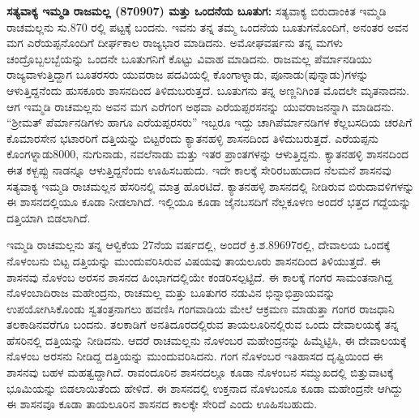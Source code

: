 \textbf{ಸತ್ಯವಾಕ್ಯ ಇಮ್ಮಡಿ ರಾಜಮಲ್ಲ (870\general{\enginline{-}}907) ಮತ್ತು ಒಂದನೆಯ ಬೂತುಗ: } ಸತ್ಯವಾಕ್ಯ ಬಿರುದಾಂಕಿತ ಇಮ್ಮಡಿ ರಾಚಮಲ್ಲನು ಸು.870 ರಲ್ಲಿ ಪಟ್ಟಕ್ಕೆ ಬಂದನು. ಇವನು ತನ್ನ ತಮ್ಮ ಒಂದನೆಯ ಬೂತುಗನೊಂದಿಗೆ, ಅನಂತರ ಅವನ ಮಗ ಎರೆಯಪ್ಪನೊಂದಿಗೆ ದೀರ್ಘಕಾಲ ರಾಜ್ಯಭಾರ ಮಾಡಿದನು. ಅಮೋಘವರ್ಷನು ತನ್ನ ಮಗಳು ಚಂದ್ರೊಬ್ಬಲಬ್ಬೆಯನ್ನು ಒಂದನೇ ಬೂತುಗನಿಗೆ ಕೊಟ್ಟು ವಿವಾಹ ಮಾಡಿದನು. ರಾಜಮಲ್ಲ ಪೆರ್ಮಾನಡಿಯು ರಾಜ್ಯವಾಳುತ್ತಿದ್ದಾಗ ಬೂತರಸರು ಯುವರಾಜ ಪದವಿಯಲ್ಲಿ ಕೊಂಗಾಳ್ನಾಡು, ಪೂನಾಡು(ಪುನ್ನಾಡು)ಗಳನ್ನು ಆಳುತ್ತಿದ್ದನೆಂದು ಹುಸಕೂರು ಶಾಸನದಿಂದ ತಿಳಿದುಬರುತ್ತದೆ. ಬೂತುಗನು ತನ್ನ ಅಣ್ಣನಿಗಿಂತ ಮೊದಲೇ ಮೃತನಾದನು. ಆಗ ಇಮ್ಮಡಿ ರಾಚಮಲ್ಲನು ಅವನ ಮಗ ಎರೆಗಂಗ ಅಥವಾ ಎರೆಯಪ್ಪರಸನನ್ನು ಯುವರಾಜನನ್ನಾಗಿ ಮಾಡಿದನು. “ಶ‍್ರೀಮತ್​ ಪೆರ್ಮಾನಡಿಗಳು ಹಾಗೂ ಎರೆಯಪ್ಪರಸರು” ಇಬ್ಬರೂ ಇದ್ದು ಚಾಗಿಪೆರ್ಮಾನಡಿಗಳ ಕೆಲ್ಲಬಸದಿಯ ಚರಪಿಗೆ ಕೊಮಾರಸೇನ ಭಟಾರರಿಗೆ ದತ್ತಿಯನ್ನು ಬಿಟ್ಟರೆಂದು ಕ್ಯಾತನಹಳ್ಳಿ ಶಾಸನದಿಂದ ತಿಳಿದುಬರುತ್ತದೆ. ಎರೆಯಪ್ಪನು ಕೊಂಗಳ್ನಾಡು8000, ನುಗುನಾಡು, ನವಲೆನಾಡು ಮತ್ತು ಇತರ ಪ್ರಾಂತಗಳನ್ನು ಆಳುತ್ತಿದ್ದನು. ಕ್ಯಾತನಹಳ್ಳಿ ಶಾಸನದಿಂದ ಈತ ಕಳ್ಬಪ್ಪು ನಾಡನ್ನೂ ಆಳುತ್ತಿದ್ದನೆಂದು ಊಹಿಸಬಹುದು. ಇದೇ ಕಾಲಕ್ಕೆ ಸೇರಿರಬಹುದಾದ ನೆಲಮನೆ ಶಾಸನವು ಸತ್ಯವಾಕ್ಯ ಇಮ್ಮಡಿ ರಾಚಮಲ್ಲನ ಹೆಸರಿನಲ್ಲಿ ಮಾತ್ರ ಹೊರಟಿದೆ. ಕ್ಯಾತನಹಳ್ಳಿ ಶಾಸನದಲ್ಲಿ ನೀಡಿರುವ ಬಿರುದಾವಳಿಗಳನ್ನು ಈ ಶಾಸನದಲ್ಲಿಯೂ ಕೂಡಾ ನೀಡಲಾಗಿದೆ. ಇಲ್ಲಿಯೂ ಕೂಡಾ ಜೈನಬಸದಿಗೆ ನೆಲ್ಲಕೂಳಣ ಅಂದರೆ ಭತ್ತದ ಗದ್ದೆಯನ್ನು ದತ್ತಿಯಾಗಿ ಬಿಡಲಾಗಿದೆ.

ಇಮ್ಮಡಿ ರಾಚಮಲ್ಲನು ತನ್ನ ಆಳ್ವಿಕೆಯ 27ನೆಯ ವರ್ಷದಲ್ಲಿ, ಅಂದರೆ ಕ್ರಿ.ಶ.896\enginline{-}97ರಲ್ಲಿ, ದೇವಾಲಯ ಒಂದಕ್ಕೆ ನೊಳಂಬನು ಬಿಟ್ಟ ದತ್ತಿಯನ್ನು ಮುಂದುವರಿಸಿರುವ ವಿಷಯವು ತಾಯಲೂರು ಶಾಸನದಿಂದ ತಿಳಿಯುತ್ತದೆ. ಈ ಶಾಸನವು ನೊಳಂಬ ಅರಸನ ಶಾಸನದ ಹಿಂಭಾಗದಲ್ಲಿಯೇ ಕಂಡರಿಸಲ್ಪಟ್ಟಿದೆ. ಈ ಕಾಲಕ್ಕೆ ಗಂಗರ ಸಾಮಂತನಾಗಿದ್ದ ನೊಳಂಬಾದಿರಾಜ ಮಹೇಂದ್ರನು, ರಾಚಮಲ್ಲ ಮತ್ತು ಬೂತುಗರ ನಡುವಿನ ಭಿನ್ನಾಭಿಪ್ರಾಯವನ್ನು ಉಪಯೋಗಿಸಿಕೊಂಡು ಸ್ವತಂತ್ರನಾಗಲು ಹವಣಿಸಿ ಗಂಗವಾಡಿಯ ಮೇಲೆ ಆಕ್ರಮಣ ಮಾಡುತ್ತಾ ಗಂಗರ ರಾಜಧಾನಿ ತಲಕಾಡಿನವರೆಗೂ ಬಂದನು. ತಲಕಾಡಿಗೆ ಅನತಿದೂರದಲ್ಲಿರುವ ತಾಯಲೂರಿನಲ್ಲಿರುವ ಒಂದು ದೇವಾಲಯಕ್ಕೆ ತನ್ನ ಹೆಸರಿನಲ್ಲಿ ದತ್ತಿಯನ್ನು ನೀಡಿದನು. ಆದರೆ ರಾಚಮಲ್ಲನು ನೊಳಂಬರ ಮಹೇಂದ್ರನನ್ನು ಹಿಮ್ಮೆಟ್ಟಿಸಿ, ಈ ದೇವಾಲಯಕ್ಕೆ ನೊಳಂಬ ಅರಸನು ನೀಡಿದ್ದ ದತ್ತಿಯನ್ನು ಮುಂದುವರಿಸಿದನು. ಗಂಗ ನೊಳಂಬರ ಇತಿಹಾಸದ ದೃಷ್ಟಿಯಿಂದ ಈ ಶಾಸನವು ಬಹಳ ಮಹತ್ವದ್ದಾಗಿದೆ. ರಾವಂದೂರಿನ ಶಾಸನದಲ್ಲೂ ಕೂಡಾ ನೊಳಂಬನ ಸಮ್ಮುಖದಲ್ಲಿ ಬಿತ್ತುವಾಟಕ್ಕೆ ಭೂಮಿಯನ್ನು ಬಿಡಲಾಯಿತೆಂದು ಹೇಳಿದೆ. ಈ ಶಾಸನದಲ್ಲಿ ಉಕ್ತನಾದ ನೊಳಬಂನೂ ಕೂಡಾ ಮಹೇಂದ್ರನೇ ಆಗಿದ್ದು ಈ ಶಾಸನವೂ ಕೂಡಾ ತಾಯಲೂರಿನ ಶಾಸನದ ಕಾಲಕ್ಕೇ ಸೇರಿದೆ ಎಂದು ಊಹಿಸಬಹುದು.

